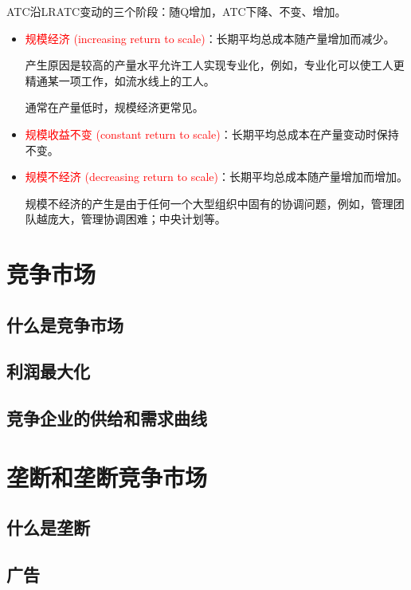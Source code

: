 \documentclass[12pt, a4paper]{article}
\begin{document}
ATC沿LRATC变动的三个阶段：随Q增加，ATC下降、不变、增加。

\begin{itemize}
  \item \textcolor{red}{规模经济 (increasing return to scale)}：长期平均总成本随产量增加而减少。 
  
  产生原因是较高的产量水平允许工人实现专业化，例如，专业化可以使工人更精通某一项工作，如流水线上的工人。 
  
  通常在产量低时，规模经济更常见。

  \item \textcolor{red}{规模收益不变 (constant return to scale)}：长期平均总成本在产量变动时保持不变。

  \item \textcolor{red}{规模不经济 (decreasing return to scale)}：长期平均总成本随产量增加而增加。 
  
  规模不经济的产生是由于任何一个大型组织中固有的协调问题，例如，管理团队越庞大，管理协调困难；中央计划等。
\end{itemize}


\newpage
\section{竞争市场}

\subsection{什么是竞争市场}

\subsection{利润最大化}

\subsection{竞争企业的供给和需求曲线}

\newpage
\section{垄断和垄断竞争市场}

\subsection{什么是垄断}


\subsection{广告}
\end{document}
